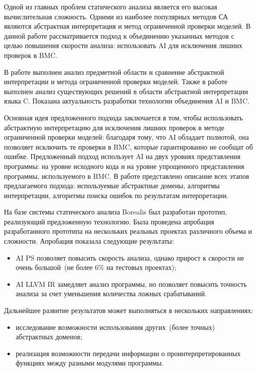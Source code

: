 \conclusion
Одной из главных проблем статического анализа является его высокая 
вычислительная сложность. Одними из наиболее популярных методов СА являются 
абстрактная интерпретация и метод ограниченной проверки моделей.
В данной работе рассматривается подход к объединению указанных методов с целью
повышения скорости анализа: использовать AI для исключения лишних проверок в BMC.

В работе выполнен анализ предметной области и сравнение абстрактной интерпретации
и метода ограниченной проверки моделей. Также в работе выполнен анализ 
существующих решений в области абстрактной интерпретации языка C. Показана 
актуальность разработки технологии объединения AI и BMC.

Основная идея предложенного подхода заключается в том, чтобы использовать 
абстрактную интерпретацию для исключения лишних проверок в методе ограниченной 
проверки моделей: благодаря тому, что AI обладает полнотой, она позволяет 
исключить те проверки в BMC, которые гарантированно не сообщат об ошибке. 
Предложенный подход использует AI на двух уровнях представления программы:
на уровне исходного кода и на уровне упрощенного представления программы, 
используемого в BMC. В работе представлено описание всех этапов предлагаемого
подхода: используемые абстрактные домены, алгоритмы интерпретации, алгоритмы 
поиска ошибок по результатам интерпретации.

На базе системы статического анализа Borealis был разработан прототип, 
реализующий предложенную технологию. Была проведена апробация разработанного
прототипа на нескольких реальных проектах различного объема и сложности. 
Апробация показала следующие результаты:
\begin{itemize}
\item AI PS позволяет повысить скорость анализа, однако прирост к скорости не 
очень большой~(не более 6\% на тестовых проектах);
\item AI LLVM IR замедляет анализ программы, но позволяет повысить точность анализа за счет уменьшения количества ложных срабатываний.
\end{itemize}

Дальнейшее развитие результатов может выполняться в нескольких направлениях:
\begin{itemize}
\item исследование возможности использования других~(более точных) абстрактных
доменов;
\item реализация возможности передачи информации о проинтерпретированных функциях
между разными модулями программы.
\end{itemize}
